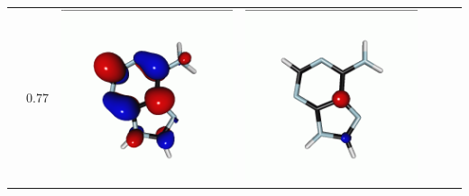 \documentclass[journal=jctcce,manuscript=article]{achemso}
\begin{document}
\begin{table}[H]
\begin{tabular}{ l| c c c | c c c }
\begin{minipage}{0.2\textwidth}
    \end{minipage}
    & 0.77
    &  \begin{minipage}{0.2\textwidth}
        \centering
        \includegraphics[scale=0.10]{NTO/Adenine_C/3p_C1.png}
    \end{minipage}
    & 
    \begin{minipage}{0.2\textwidth}
        \centering
        \includegraphics[scale=0.10]{NTO/Adenine_C/3h_Cs.png}

\end{minipage}
\end{tabular}
\end{table}
\end{document}
